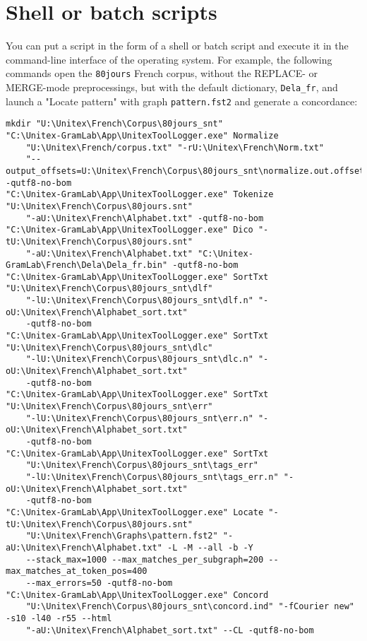 \section{Shell or batch scripts}
\label{section-batch}

You can put a script in the form of a shell or batch script and execute it in the command-line
interface of the operating system. For example, the following commands open the
\verb$80jours$ French corpus, without the REPLACE- or MERGE-mode preprocessings, but with the default
dictionary, \verb$Dela_fr$, and launch a "Locate pattern" with graph \verb$pattern.fst2$
and generate a concordance:

\begin{Verbatim}[fontsize=\small,fontfamily=helvetica]
mkdir "U:\Unitex\French\Corpus\80jours_snt" 
"C:\Unitex-GramLab\App\UnitexToolLogger.exe" Normalize
    "U:\Unitex\French/corpus.txt" "-rU:\Unitex\French\Norm.txt"
    "--output_offsets=U:\Unitex\French\Corpus\80jours_snt\normalize.out.offsets" -qutf8-no-bom
"C:\Unitex-GramLab\App\UnitexToolLogger.exe" Tokenize "U:\Unitex\French\Corpus\80jours.snt" 
    "-aU:\Unitex\French\Alphabet.txt" -qutf8-no-bom
"C:\Unitex-GramLab\App\UnitexToolLogger.exe" Dico "-tU:\Unitex\French\Corpus\80jours.snt" 
    "-aU:\Unitex\French\Alphabet.txt" "C:\Unitex-GramLab\French\Dela\Dela_fr.bin" -qutf8-no-bom
"C:\Unitex-GramLab\App\UnitexToolLogger.exe" SortTxt "U:\Unitex\French\Corpus\80jours_snt\dlf" 
    "-lU:\Unitex\French\Corpus\80jours_snt\dlf.n" "-oU:\Unitex\French\Alphabet_sort.txt"
    -qutf8-no-bom
"C:\Unitex-GramLab\App\UnitexToolLogger.exe" SortTxt "U:\Unitex\French\Corpus\80jours_snt\dlc" 
    "-lU:\Unitex\French\Corpus\80jours_snt\dlc.n" "-oU:\Unitex\French\Alphabet_sort.txt"
    -qutf8-no-bom
"C:\Unitex-GramLab\App\UnitexToolLogger.exe" SortTxt "U:\Unitex\French\Corpus\80jours_snt\err" 
    "-lU:\Unitex\French\Corpus\80jours_snt\err.n" "-oU:\Unitex\French\Alphabet_sort.txt"
    -qutf8-no-bom
"C:\Unitex-GramLab\App\UnitexToolLogger.exe" SortTxt
    "U:\Unitex\French\Corpus\80jours_snt\tags_err"
    "-lU:\Unitex\French\Corpus\80jours_snt\tags_err.n" "-oU:\Unitex\French\Alphabet_sort.txt"
    -qutf8-no-bom
"C:\Unitex-GramLab\App\UnitexToolLogger.exe" Locate "-tU:\Unitex\French\Corpus\80jours.snt" 
    "U:\Unitex\French\Graphs\pattern.fst2" "-aU:\Unitex\French\Alphabet.txt" -L -M --all -b -Y
    --stack_max=1000 --max_matches_per_subgraph=200 --max_matches_at_token_pos=400 
    --max_errors=50 -qutf8-no-bom
"C:\Unitex-GramLab\App\UnitexToolLogger.exe" Concord
    "U:\Unitex\French\Corpus\80jours_snt\concord.ind" "-fCourier new" -s10 -l40 -r55 --html 
    "-aU:\Unitex\French\Alphabet_sort.txt" --CL -qutf8-no-bom
\end{Verbatim}

